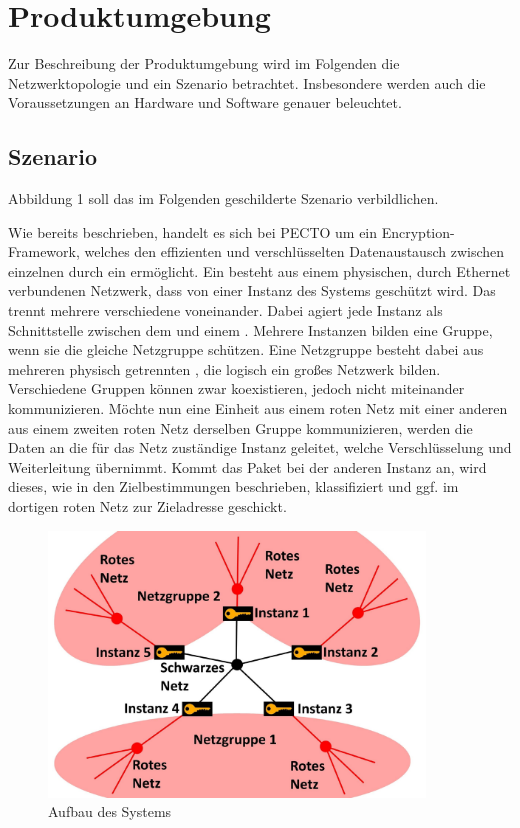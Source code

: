 \section{Produktumgebung}
Zur Beschreibung der Produktumgebung wird im Folgenden die Netzwerktopologie und ein Szenario betrachtet. Insbesondere werden auch die Voraussetzungen an Hardware und Software genauer beleuchtet.

\subsection{Szenario}
Abbildung 1 soll das im Folgenden geschilderte Szenario verbildlichen.

Wie bereits beschrieben, handelt es sich bei PECTO um ein Encryption-Framework, welches den effizienten und verschlüsselten Datenaustausch zwischen einzelnen  durch ein  ermöglicht.
Ein  besteht aus einem physischen, durch Ethernet verbundenen Netzwerk, dass von einer Instanz des Systems geschützt wird.
Das  trennt mehrere verschiedene  voneinander.
Dabei agiert jede Instanz als Schnittstelle zwischen dem  und einem .
Mehrere Instanzen bilden eine Gruppe, wenn sie die gleiche Netzgruppe schützen.
Eine Netzgruppe besteht dabei aus mehreren physisch getrennten , die logisch ein großes Netzwerk bilden.
Verschiedene Gruppen können zwar koexistieren, jedoch nicht miteinander kommunizieren.
Möchte nun eine Einheit aus einem roten Netz mit einer anderen aus einem zweiten roten Netz derselben Gruppe kommunizieren, werden die Daten an die für das Netz zuständige Instanz geleitet, welche Verschlüsselung und Weiterleitung übernimmt.
Kommt das Paket bei der anderen Instanz an, wird dieses, wie in den Zielbestimmungen beschrieben, klassifiziert und ggf. im dortigen roten Netz zur Zieladresse geschickt.     
 
  \begin{figure}  
    \begin{center}
	  \includegraphics[width = 10cm]{Bilder/PECTO_Skizze.pdf}
	  \caption{Aufbau des Systems}
    \end{center}
  \end{figure}  
  
